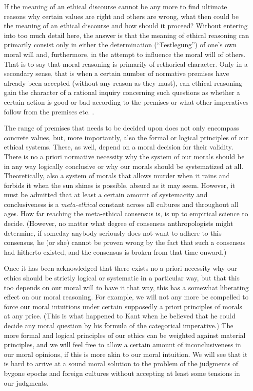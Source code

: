 \documentclass[12pt,a4paper,ngerman]{article}
\begin{document}
If the meaning of an ethical discourse cannot be any more to find ultimate
reasons why certain values are right and others are wrong, what then could be
the meaning of an ethical discourse and how should it proceed? Without
entering into too much detail here, the answer is that the meaning of ethical
reasoning can primarily consist only in either the determination
(``Festlegung'') of one's own moral will and, furthermore, in the attempt to
influence the moral will of others. That is to say that moral reasoning is
primarily of rethorical character. Only in a secondary sense, that is when a
certain number of normative premises have already been accepted (without any
reason as they must), can ethical reasoning gain the character of a rational
inquiry concerning such questions as whether a certain action is good or bad
according to the premises or what other imperatives follow from the premises
etc. .

The range of premises that needs to be decided upon does not only
encompass concrete values, but, more importantly, also the formal or
logical principles of our ethical systems. These, as well, depend on a
moral decision for their validity. There is no a priori normative
necessity why the system of our morals should be in any way logically
conclusive or why our morals should be systematized at all.
Theoretically, also a system of morals that allows murder when it
rains and forbids it when the sun shines is possible, absurd as it may
seem. However, it must be admitted that at least a certain amount of
systemacity and conclusiveness is a {\em meta-ethical} constant across
all cultures and throughout all ages. How far reaching the
meta-ethical consensus is, is up to empirical science to decide.
(However, no matter what degree of consensus anthropologists might
determine, if someday anybody seriously does not want to adhere to
this consensus, he (or she) cannot be proven wrong by the fact that
such a consensus had hitherto existed, and the consensus is broken
from that time onward.)

Once it has been acknowledged that there exists no a priori necessity why our
ethics should be strictly logical or systematic in a particular way, but that
this too depends on our moral will to have it that way, this has a somewhat
liberating effect on our moral reasoning. For example, we will not any more be
compelled to force our moral intuitions under certain supposedly a priori
principles of morals at any price. (This is what happened to Kant when he
believed that he could decide any moral question by his formula of the
categorical imperative.)  The more formal and logical principles of our ethics
can be weighted against material principles, and we will feel free to allow a
certain amount of inconclusiveness in our moral opinions, if this is more akin
to our moral intuition. We will see that it is hard to arrive at a sound moral
solution to the problem of the judgments of bygone epochs and foreign cultures
without accepting at least some tensions in our judgments.
\end{document}
